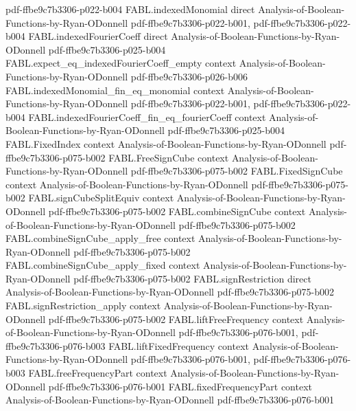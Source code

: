 \begin{theorem}
  {pdf-ffbe9c7b3306-p022-b004}
\proofstep
  {FABL.indexedMonomial}
  {direct}
  {Analysis-of-Boolean-Functions-by-Ryan-ODonnell}
  {pdf-ffbe9c7b3306-p022-b001,
    pdf-ffbe9c7b3306-p022-b004}
\proofstep
  {FABL.indexedFourierCoeff}
  {direct}
  {Analysis-of-Boolean-Functions-by-Ryan-ODonnell}
  {pdf-ffbe9c7b3306-p025-b004}
\proofstep
  {FABL.expect_eq_indexedFourierCoeff_empty}
  {context}
  {Analysis-of-Boolean-Functions-by-Ryan-ODonnell}
  {pdf-ffbe9c7b3306-p026-b006}
\proofstep
  {FABL.indexedMonomial_fin_eq_monomial}
  {context}
  {Analysis-of-Boolean-Functions-by-Ryan-ODonnell}
  {pdf-ffbe9c7b3306-p022-b001,
    pdf-ffbe9c7b3306-p022-b004}
\proofstep
  {FABL.indexedFourierCoeff_fin_eq_fourierCoeff}
  {context}
  {Analysis-of-Boolean-Functions-by-Ryan-ODonnell}
  {pdf-ffbe9c7b3306-p025-b004}
\proofstep
  {FABL.FixedIndex}
  {context}
  {Analysis-of-Boolean-Functions-by-Ryan-ODonnell}
  {pdf-ffbe9c7b3306-p075-b002}
\proofstep
  {FABL.FreeSignCube}
  {context}
  {Analysis-of-Boolean-Functions-by-Ryan-ODonnell}
  {pdf-ffbe9c7b3306-p075-b002}
\proofstep
  {FABL.FixedSignCube}
  {context}
  {Analysis-of-Boolean-Functions-by-Ryan-ODonnell}
  {pdf-ffbe9c7b3306-p075-b002}
\proofstep
  {FABL.signCubeSplitEquiv}
  {context}
  {Analysis-of-Boolean-Functions-by-Ryan-ODonnell}
  {pdf-ffbe9c7b3306-p075-b002}
\proofstep
  {FABL.combineSignCube}
  {context}
  {Analysis-of-Boolean-Functions-by-Ryan-ODonnell}
  {pdf-ffbe9c7b3306-p075-b002}
\proofstep
  {FABL.combineSignCube_apply_free}
  {context}
  {Analysis-of-Boolean-Functions-by-Ryan-ODonnell}
  {pdf-ffbe9c7b3306-p075-b002}
\proofstep
  {FABL.combineSignCube_apply_fixed}
  {context}
  {Analysis-of-Boolean-Functions-by-Ryan-ODonnell}
  {pdf-ffbe9c7b3306-p075-b002}
\proofstep
  {FABL.signRestriction}
  {direct}
  {Analysis-of-Boolean-Functions-by-Ryan-ODonnell}
  {pdf-ffbe9c7b3306-p075-b002}
\proofstep
  {FABL.signRestriction_apply}
  {context}
  {Analysis-of-Boolean-Functions-by-Ryan-ODonnell}
  {pdf-ffbe9c7b3306-p075-b002}
\proofstep
  {FABL.liftFreeFrequency}
  {context}
  {Analysis-of-Boolean-Functions-by-Ryan-ODonnell}
  {pdf-ffbe9c7b3306-p076-b001,
    pdf-ffbe9c7b3306-p076-b003}
\proofstep
  {FABL.liftFixedFrequency}
  {context}
  {Analysis-of-Boolean-Functions-by-Ryan-ODonnell}
  {pdf-ffbe9c7b3306-p076-b001,
    pdf-ffbe9c7b3306-p076-b003}
\proofstep
  {FABL.freeFrequencyPart}
  {context}
  {Analysis-of-Boolean-Functions-by-Ryan-ODonnell}
  {pdf-ffbe9c7b3306-p076-b001}
\proofstep
  {FABL.fixedFrequencyPart}
  {context}
  {Analysis-of-Boolean-Functions-by-Ryan-ODonnell}
  {pdf-ffbe9c7b3306-p076-b001}
\proofstep

\end{theorem}
